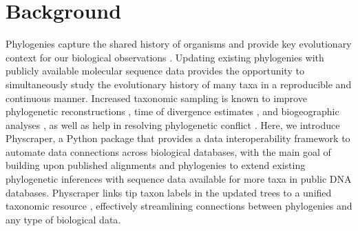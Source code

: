 \documentclass{bmcart}
\begin{document}


\section*{Background}
Phylogenies capture the shared history of organisms and provide key evolutionary
context for our biological observations \cite{dobzhansky1973nothing}.
Updating existing phylogenies with publicly available molecular sequence data provides
the opportunity to simultaneously study
the evolutionary history of many taxa in a reproducible and continuous manner.
Increased taxonomic sampling is known to improve
phylogenetic reconstructions \cite{hillis1996inferring, natsidis2019phylogenomics},
time of divergence estimates \cite{schulte2013undersampling, soares2015influence},
and biogeographic analyses \cite{kayaalp2017back},
as well as help in resolving phylogenetic conflict \cite{hedtke2006resolution, townsend2010optimal, natsidis2019phylogenomics}.
Here, we introduce Physcraper, a Python package that provides a data interoperability
framework to automate data connections across biological databases,
with the main goal of building upon published alignments and phylogenies
to extend existing phylogenetic inferences with sequence data available for more taxa
in public DNA databases.
Physcraper links tip taxon labels in the updated trees to a unified
taxonomic resource \cite{rees2017automated}, effectively streamlining connections
between phylogenies and any type of biological data.
\end{document}
